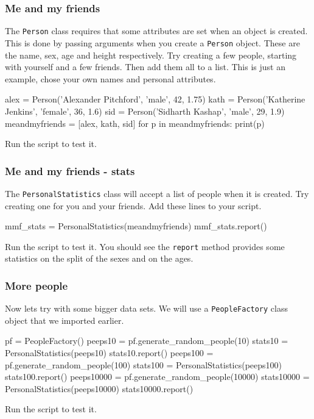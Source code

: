 \documentclass{beamer}
\begin{document}
\begin{frame}[fragile]
\frametitle{Me and my friends}
The \texttt{Person} class requires that some attributes are set when an object is created.
This is done by passing arguments when you create a \texttt{Person} object.
These are the name, sex, age and height respectively.
Try creating a few people, starting with yourself and a few friends. 
Then add them all to a list. This is just an example, chose your own names and personal attributes.

\begin{shaded}
\begin{code} 
alex = Person('Alexander Pitchford', 'male', 42, 1.75)
kath = Person('Katherine Jenkins', 'female', 36, 1.6)
sid = Person('Sidharth Kashap', 'male', 29, 1.9)
meandmyfriends = [alex, kath, sid]
for p in meandmyfriends:
    print(p)
\end{code}
\end{shaded}
Run the script to test it.

\end{frame}

\begin{frame}[fragile]
\frametitle{Me and my friends - stats}
The \texttt{PersonalStatistics} class will accept a list of people when it is created.
Try creating one for you and your friends. Add these lines to your script.

\begin{shaded}
\begin{code} 
mmf_stats = PersonalStatistics(meandmyfriends)
mmf_stats.report()
\end{code}
\end{shaded}
Run the script to test it.
You should see the \texttt{report} method provides some statistics 
on the split of the sexes and on the ages.

\end{frame}

\begin{frame}[fragile]
\frametitle{More people}
Now lets try with some bigger data sets. We will use a \texttt{PeopleFactory}
class object that we imported earlier.

\begin{shaded}
\begin{code} 
pf = PeopleFactory()
peeps10 = pf.generate_random_people(10)
stats10 = PersonalStatistics(peeps10)
stats10.report()
peeps100 = pf.generate_random_people(100)
stats100 = PersonalStatistics(peeps100)
stats100.report()
peeps10000 = pf.generate_random_people(10000)
stats10000 = PersonalStatistics(peeps10000)
stats10000.report()
\end{code}
\end{shaded}
Run the script to test it.


\end{frame}
\end{document}
